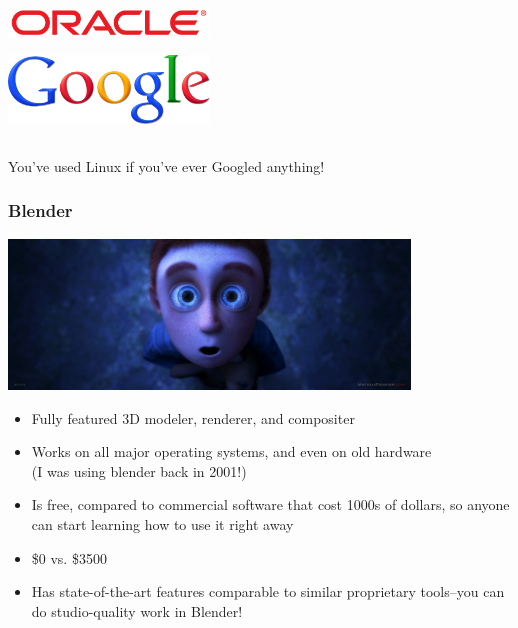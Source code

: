 \documentclass{beamer}
\begin{document}
\begin{frame}
\begin{columns}
\begin{center}
      \includegraphics[width=0.4\textwidth]{../img/oracle}

      \includegraphics[width=0.4\textwidth]{../img/google}
    \end{center}
  \end{columns}
  \begin{center}
    You've used Linux if you've ever Googled anything!
  \end{center}

\end{frame}

\begin{frame}
  \frametitle{Blender}
  \begin{center} \includegraphics[width=0.8\textwidth]{../img/blenderex} \end{center}
  \begin{itemize}
  \item Fully featured 3D modeler, renderer, and compositer
  \item Works on all major operating systems, and even on old hardware
    \\ (I was using blender back in 2001!)
  \item Is free, compared to commercial software that cost 1000s of
    dollars, so anyone can start learning how to use it right away
  \item \$0 vs. \$3500
  \item Has state-of-the-art features comparable to similar
    proprietary tools--you can do studio-quality work in Blender!
  \end{itemize}
\end{frame}
\end{document}
